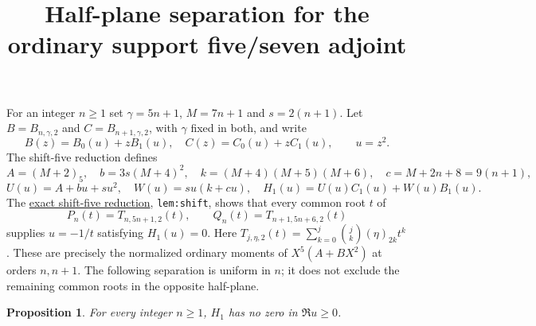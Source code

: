 \documentclass[11pt]{article}
\newtheorem{proposition}[lemma]{Proposition}
\begin{document}
\title{Half-plane separation for the ordinary support five/seven adjoint}
\author{}\date{}\maketitle
For an integer $n\ge1$ set $\gamma=5n+1$, $M=7n+1$ and
$s=2(n+1)$. Let $B=B_{n,\gamma,2}$ and $C=B_{n+1,\gamma,2}$,
with $\gamma$ fixed in both, and write
\[
 B(z)=B_0(u)+zB_1(u),\quad
 C(z)=C_0(u)+zC_1(u),\qquad u=z^2.
\]
The shift-five reduction defines
\[
 A=(M+2)_5,\quad b=3s(M+4)^2,\quad
 k=(M+4)(M+5)(M+6),\quad c=M+2n+8=9(n+1),
\]
\[
 U(u)=A+bu+su^2,\quad W(u)=su(k+cu),\quad
 H_1(u)=U(u)C_1(u)+W(u)B_1(u).
\]
The \href{LOWER_FIVE_QUADRATIC_RESIDUE_REDUCTION.tex}{exact shift-five reduction},
\texttt{lem:shift}, shows that every common root $t$ of
\[
 P_n(t)=T_{n,5n+1,2}(t),\qquad
 Q_n(t)=T_{n+1,5n+6,2}(t)
\]
supplies $u=-1/t$ satisfying $H_1(u)=0$.
Here $T_{j,\eta,2}(t)=\sum_{k=0}^j\binom jk(\eta)_{2k}t^k$.
These are precisely the normalized ordinary moments of
$X^5(A+BX^2)$ at orders $n,n+1$.
The following separation is uniform in $n$; it does not exclude
the remaining common roots in the opposite half-plane.
\begin{proposition}\label{prop:odd-adjoint}
For every integer $n\ge1$, $H_1$ has no zero in $\Re u\ge0$.
\end{proposition}
\end{document}
